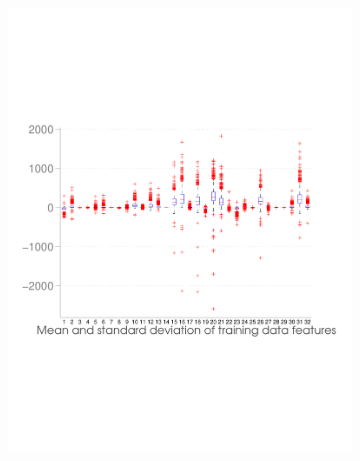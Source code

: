 \begin{figure}[h]
	\begin{subfigure}[b]{0.45\textwidth}
   \includegraphics[width=\textwidth]{figures/classification_distribution.pdf}
    \label{fig:dist_classification}
  \end{subfigure}
  \hfill
  \begin{subfigure}[b]{0.42\textwidth}

\end{subfigure}
\end{figure}
